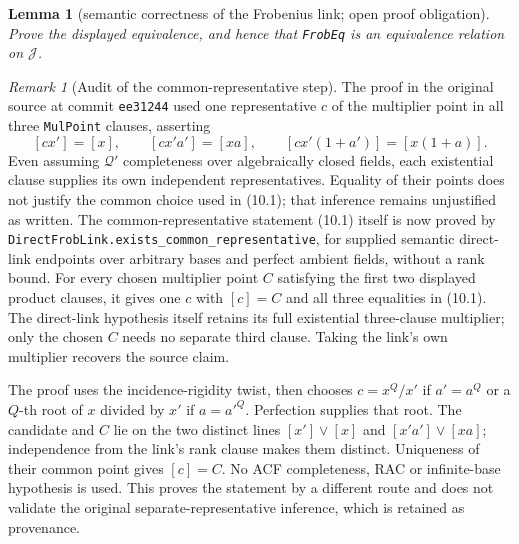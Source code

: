 \documentclass[11pt,oneside]{article}
\newtheorem{lemma}[theorem]{Lemma}
\theoremstyle{definition}
\theoremstyle{remark}
\newtheorem{remark}[theorem]{Remark}
\newcommand{\Qprel}{\mathcal{Q}'}
\newcommand{\Jrel}{\mathcal{J}}
\newcommand{\lean}[1]{\nolinkurl{#1}}
\begin{document}
\begin{lemma}[semantic correctness of the Frobenius link; open proof obligation]
\label{lem:frobeq-correct}
Prove the displayed equivalence, and hence that \lean{FrobEq} is an equivalence
relation on $\Jrel$.
\end{lemma}
\begin{remark}[Audit of the common-representative step]\label{rem:frob-link-audit}
The proof in the original source at commit \texttt{ee31244} used one representative
$c$ of the multiplier point in all three \lean{MulPoint} clauses, asserting
\[
 [cx']=[x],\qquad[cx'a']=[xa],\qquad[cx'(1+a')]=[x(1+a)].       \tag{10.1}
\]
Even assuming $\Qprel$ completeness over algebraically closed fields, each
existential clause supplies its own independent representatives. Equality of their
points does not justify the common choice used in (10.1); that inference remains
unjustified as written. The common-representative statement (10.1) itself is now proved
by \lean{DirectFrobLink.exists_common_representative}, for supplied semantic direct-link
endpoints over arbitrary bases and perfect ambient fields, without a rank bound.
For every chosen multiplier point $C$ satisfying the first two displayed product clauses,
it gives one $c$ with $[c]=C$ and all three equalities in (10.1). The direct-link hypothesis
itself retains its full existential three-clause multiplier; only the chosen $C$ needs
no separate third clause. Taking the link's own multiplier recovers the source claim.

The proof uses the incidence-rigidity twist, then chooses $c=x^Q/x'$ if $a'=a^Q$ or
a $Q$-th root of $x$ divided by $x'$ if $a=a'^Q$. Perfection supplies that root.
The candidate and $C$ lie on the two distinct lines $[x']\vee[x]$ and
$[x'a']\vee[xa]$; independence from the link's rank clause makes them distinct.
Uniqueness of their common point gives $[c]=C$. No ACF completeness, RAC or infinite-base
hypothesis is used. This proves the statement by a different route and does not validate
the original separate-representative inference, which is retained as provenance.


\end{remark}
\end{document}
